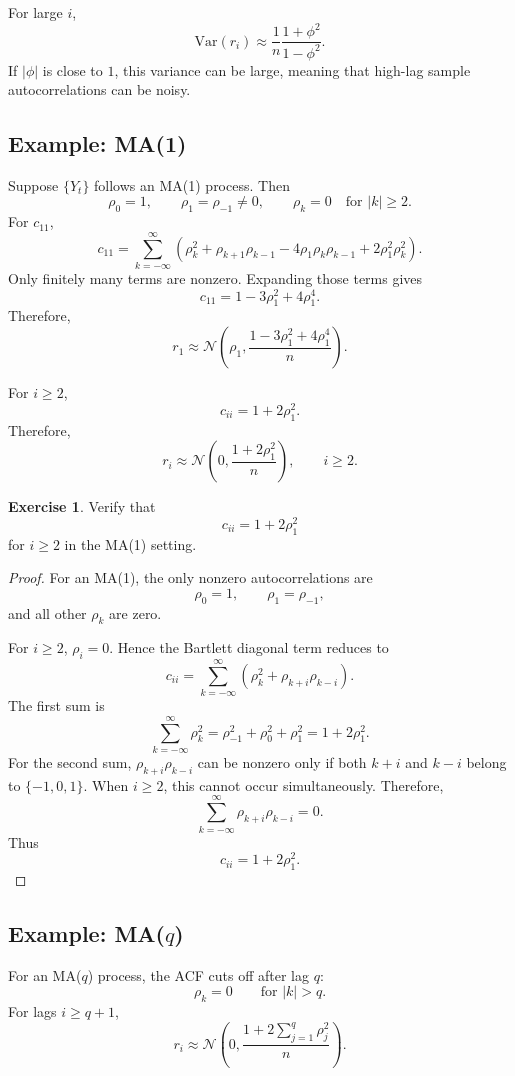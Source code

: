 \documentclass[12pt,oneside]{book}
\numberwithin{equation}{section}
\theoremstyle{definition}
\newtheorem{exercise}{Exercise}[section]
\theoremstyle{plain}
\theoremstyle{remark}
\newcommand{\Var}{\mathrm{Var}}
\newcommand{\Normal}{\mathcal{N}}
\begin{document}
For large $i$,
\[
\Var(r_i)
\approx
\frac{1}{n}
\frac{1+\phi^2}{1-\phi^2}.
\]
If $|\phi|$ is close to $1$, this variance can be large, meaning that high-lag sample autocorrelations can be noisy.

\subsection{Example: MA(1)}

Suppose $\{Y_t\}$ follows an MA(1) process. Then
\[
\rho_0=1,
\qquad
\rho_1=\rho_{-1}\neq 0,
\qquad
\rho_k=0
\quad
\text{for } |k|\geq 2.
\]
For $c_{11}$,
\[
c_{11}
=
\sum_{k=-\infty}^{\infty}
\left(
\rho_k^2+\rho_{k+1}\rho_{k-1}
-4\rho_1\rho_k\rho_{k-1}
+2\rho_1^2\rho_k^2
\right).
\]
Only finitely many terms are nonzero. Expanding those terms gives
\[
c_{11}
=
1-3\rho_1^2+4\rho_1^4.
\]
Therefore,
\[
r_1
\approx
\Normal\left(
\rho_1,
\frac{1-3\rho_1^2+4\rho_1^4}{n}
\right).
\]

For $i\geq 2$,
\[
c_{ii}=1+2\rho_1^2.
\]
Therefore,
\[
r_i
\approx
\Normal\left(
0,
\frac{1+2\rho_1^2}{n}
\right),
\qquad i\geq 2.
\]

\begin{exercise}
Verify that
\[
c_{ii}=1+2\rho_1^2
\]
for $i\geq 2$ in the MA(1) setting.
\end{exercise}

\begin{proof}
For an MA(1), the only nonzero autocorrelations are
\[
\rho_0=1,
\qquad
\rho_1=\rho_{-1},
\]
and all other $\rho_k$ are zero.

For $i\geq 2$, $\rho_i=0$. Hence the Bartlett diagonal term reduces to
\[
c_{ii}
=
\sum_{k=-\infty}^{\infty}
\left(
\rho_k^2+\rho_{k+i}\rho_{k-i}
\right).
\]
The first sum is
\[
\sum_{k=-\infty}^{\infty}\rho_k^2
=
\rho_{-1}^2+\rho_0^2+\rho_1^2
=
1+2\rho_1^2.
\]
For the second sum, $\rho_{k+i}\rho_{k-i}$ can be nonzero only if both $k+i$ and $k-i$ belong to $\{-1,0,1\}$. When $i\geq 2$, this cannot occur simultaneously. Therefore,
\[
\sum_{k=-\infty}^{\infty}\rho_{k+i}\rho_{k-i}=0.
\]
Thus
\[
c_{ii}=1+2\rho_1^2.
\]
\end{proof}

\subsection*{Example: MA($q$)}

For an MA($q$) process, the ACF cuts off after lag $q$:
\[
\rho_k=0
\qquad
\text{for } |k|>q.
\]
For lags $i\geq q+1$,
\[
r_i
\approx
\Normal\left(
0,
\frac{1+2\sum_{j=1}^q\rho_j^2}{n}
\right).
\]
\end{document}
